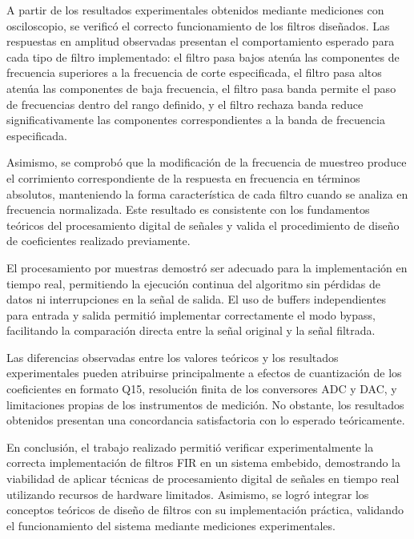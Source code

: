 \documentclass[12pt]{article}
\begin{document}
	A partir de los resultados experimentales obtenidos mediante mediciones con osciloscopio, se verificó el correcto funcionamiento de los filtros diseñados. Las respuestas en amplitud observadas presentan el comportamiento esperado para cada tipo de filtro implementado: el filtro pasa bajos atenúa las componentes de frecuencia superiores a la frecuencia de corte especificada, el filtro pasa altos atenúa las componentes de baja frecuencia, el filtro pasa banda permite el paso de frecuencias dentro del rango definido, y el filtro rechaza banda reduce significativamente las componentes correspondientes a la banda de frecuencia especificada.

	Asimismo, se comprobó que la modificación de la frecuencia de muestreo produce el corrimiento correspondiente de la respuesta en frecuencia en términos absolutos, manteniendo la forma característica de cada filtro cuando se analiza en frecuencia normalizada. Este resultado es consistente con los fundamentos teóricos del procesamiento digital de señales y valida el procedimiento de diseño de coeficientes realizado previamente.

	El procesamiento por muestras demostró ser adecuado para la implementación en tiempo real, permitiendo la ejecución continua del algoritmo sin pérdidas de datos ni interrupciones en la señal de salida. El uso de buffers independientes para entrada y salida permitió implementar correctamente el modo bypass, facilitando la comparación directa entre la señal original y la señal filtrada.

	Las diferencias observadas entre los valores teóricos y los resultados experimentales pueden atribuirse principalmente a efectos de cuantización de los coeficientes en formato Q15, resolución finita de los conversores ADC y DAC, y limitaciones propias de los instrumentos de medición. No obstante, los resultados obtenidos presentan una concordancia satisfactoria con lo esperado teóricamente.

	En conclusión, el trabajo realizado permitió verificar experimentalmente la correcta implementación de filtros FIR en un sistema embebido, demostrando la viabilidad de aplicar técnicas de procesamiento digital de señales en tiempo real utilizando recursos de hardware limitados. Asimismo, se logró integrar los conceptos teóricos de diseño de filtros con su implementación práctica, validando el funcionamiento del sistema mediante mediciones experimentales.
	
\end{document}
